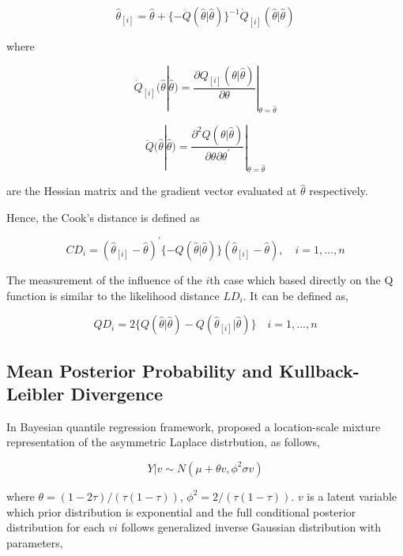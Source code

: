 \documentclass[article]{jss}
\theoremstyle{definition}
\theoremstyle{definition}
\theoremstyle{remark}
\begin{document}
\begin{equation}
\hat{\theta}_{[i]}=\hat{\theta}+\{-\ddot{Q}(\hat{\theta}|\hat{\theta})\}^{-1}\dot{Q}_{[i]}(\hat{\theta}|\hat{\theta})
\label{eq: estimator}
\end{equation}

where

\[\dot{Q}_{[i]}(\hat{\theta}|\hat{\theta})=\frac{\partial Q_{[i]}(\theta|\hat{\theta})}{\partial\theta}|_{\theta=\hat{\theta}}\]

\[\ddot{Q}(\hat{\theta}|\hat{\theta})=\frac{\partial^{2}Q(\theta|\hat{\theta})}{\partial\theta\partial \theta^{'}}|_{\theta=\hat{\theta}}\]

are the Hessian matrix and the gradient vector evaluated at
\(\hat{\theta}\) respectively.

Hence, the Cook's distance is defined as

\begin{equation}
CD_{i} =(\hat{\theta}_{[i]}-\hat{\theta})^{'}\{-Q(\hat{\theta}|\hat{\theta})\}(\hat{\theta}_{[i]}-\hat{\theta}), \quad i=1,...,n
\label{eq:gd}
\end{equation}

The measurement of the influence of the \(i\)th case which based
directly on the Q function is similar to the likelihood distance
\(LD_{i}\). It can be defined as,

\begin{equation}
QD_{i}=2\{Q(\hat{\theta}|\hat{\theta})-Q(\hat{\theta}_{[i]}|\hat{\theta})\} \quad i=1,...,n
\label{eq:qd}
\end{equation}

\subsection{Mean Posterior Probability and Kullback-Leibler
Divergence}\label{mean-posterior-probability-and-kullback-leibler-divergence}

In Bayesian quantile regression framework,
\citet{kullback1951information} proposed a location-scale mixture
representation of the asymmetric Laplace distrbution, as follows,

\begin{equation}
Y|v \sim N(\mu + \theta v, \phi^{2}\sigma v)
\label{eq:mixture}
\end{equation}

where \(\theta=(1-2\tau)/(\tau(1-\tau))\),
\(\phi^{2}=2/(\tau(1-\tau))\). \(v\) is a latent variable which prior
distribution is exponential and the full conditional posterior
distribution for each \(vi\) follows generalized inverse Gaussian
distribution with parameters,
\end{document}
